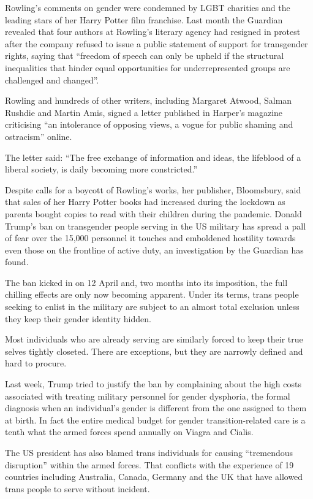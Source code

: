 Rowling’s comments on gender were condemned by LGBT charities and the leading stars of her Harry Potter film franchise. Last month the Guardian revealed that four authors at Rowling’s literary agency had resigned in protest after the company refused to issue a public statement of support for transgender rights, saying that “freedom of speech can only be upheld if the structural inequalities that hinder equal opportunities for underrepresented groups are challenged and changed”.

Rowling and hundreds of other writers, including Margaret Atwood, Salman Rushdie and Martin Amis, signed a letter published in Harper’s magazine criticising “an intolerance of opposing views, a vogue for public shaming and ostracism” online.

The letter said: “The free exchange of information and ideas, the lifeblood of a liberal society, is daily becoming more constricted.”

Despite calls for a boycott of Rowling’s works, her publisher, Bloomsbury, said that sales of her Harry Potter books had increased during the lockdown as parents bought copies to read with their children during the pandemic.
Donald Trump’s ban on transgender people serving in the US military has spread a pall of fear over the 15,000 personnel it touches and emboldened hostility towards even those on the frontline of active duty, an investigation by the Guardian has found.

The ban kicked in on 12 April and, two months into its imposition, the full chilling effects are only now becoming apparent. Under its terms, trans people seeking to enlist in the military are subject to an almost total exclusion unless they keep their gender identity hidden.

Most individuals who are already serving are similarly forced to keep their true selves tightly closeted. There are exceptions, but they are narrowly defined and hard to procure.

Last week, Trump tried to justify the ban by complaining about the high costs associated with treating military personnel for gender dysphoria, the formal diagnosis when an individual’s gender is different from the one assigned to them at birth. In fact the entire medical budget for gender transition-related care is a tenth what the armed forces spend annually on Viagra and Cialis.

The US president has also blamed trans individuals for causing “tremendous disruption” within the armed forces. That conflicts with the experience of 19 countries including Australia, Canada, Germany and the UK that have allowed trans people to serve without incident.


